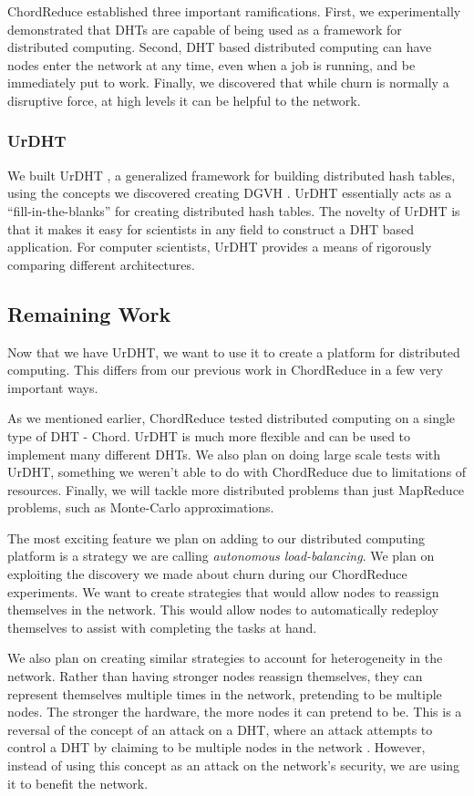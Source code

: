 \documentclass[12pt,a4paper]{article}
\begin{document}
ChordReduce established three important ramifications.
First, we experimentally demonstrated that DHTs are capable of being used as a framework for distributed computing.
Second, DHT based distributed computing can have nodes enter the network at any time, even when a job is running, and be immediately put to work.
Finally, we discovered that while churn is normally a disruptive force, at high levels it can be helpful to the network.


\subsubsection*{UrDHT}


We built UrDHT \cite{urdht}, a generalized framework for building distributed hash tables, using the concepts we discovered creating DGVH \cite{dgvh}.
UrDHT essentially acts as a ``fill-in-the-blanks'' for creating  distributed hash tables.
The novelty of UrDHT is that it makes it easy for scientists in any field to construct a DHT based application.
For computer scientists, UrDHT provides a means of rigorously comparing different architectures.



\subsection*{Remaining Work}
Now that we have UrDHT, we want to use it to create a platform for distributed computing.
This differs from our previous work in ChordReduce in a few very important ways.

As we mentioned earlier, ChordReduce tested distributed computing on a single type of DHT - Chord.
UrDHT is much more flexible and can be used to implement many different DHTs.
We also plan on doing large scale tests with UrDHT, something we weren't able to do with ChordReduce due to limitations of resources.
Finally, we will tackle more distributed problems than just MapReduce problems, such as Monte-Carlo approximations.


The most exciting feature we plan on adding to our distributed computing platform is a strategy we are calling \textit{autonomous load-balancing}.
We plan on exploiting the discovery we made about churn during our ChordReduce experiments.
We want to create strategies that would allow nodes to reassign themselves in the network.
This would allow nodes to automatically redeploy themselves to assist with completing the tasks at hand.

We also plan on creating similar strategies to account for heterogeneity in the network.
Rather than having stronger nodes reassign themselves, they can represent themselves multiple times in the network, pretending to be multiple nodes.
The stronger the hardware, the more nodes it can pretend to be.
This is a reversal of the concept of an attack on a DHT, where an attack attempts to control a DHT by claiming to be multiple nodes in the network \cite{sybil}.
However, instead of using this concept as an attack on the network's security, we are using it to benefit the network.
\end{document}
